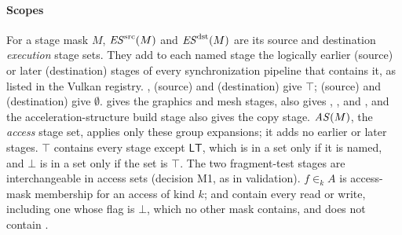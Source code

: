 \paragraph{Scopes}
For a stage mask $M$, $\mathit{ES}^{\mathrm{src}}(M)$ and $\mathit{ES}^{\mathrm{dst}}(M)$ are its source and destination \emph{execution} stage sets. They add to
each named stage the logically earlier (source) or later (destination) stages of every synchronization pipeline
that contains it, as listed in the Vulkan registry. ,  (source) and
 (destination) give $\top$;  (source) and 
(destination) give $\emptyset$.  gives the graphics and mesh stages,  also gives
, ,  and , and the acceleration-structure build stage also gives the
copy stage. $\mathit{AS}(M)$, the \emph{access} stage set, applies only these group expansions; it adds no earlier or later
stages. $\top$ contains every stage except $\mathsf{LT}$, which is in a set only if it is named, and $\bot$ is in a set
only if the set is $\top$. The two fragment-test stages are interchangeable in access sets (decision M1, as in
validation). $f \in_k A$ is access-mask membership for an access of kind $k$;  and
 contain every read or write, including one whose flag is $\bot$, which no other mask contains,
and  does not contain .

